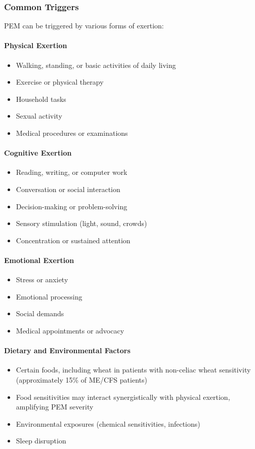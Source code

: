 \subsubsection{Common Triggers}

PEM can be triggered by various forms of exertion:

\paragraph{Physical Exertion}
\begin{itemize}
    \item Walking, standing, or basic activities of daily living
    \item Exercise or physical therapy
    \item Household tasks
    \item Sexual activity
    \item Medical procedures or examinations
\end{itemize}

\paragraph{Cognitive Exertion}
\begin{itemize}
    \item Reading, writing, or computer work
    \item Conversation or social interaction
    \item Decision-making or problem-solving
    \item Sensory stimulation (light, sound, crowds)
    \item Concentration or sustained attention
\end{itemize}

\paragraph{Emotional Exertion}
\begin{itemize}
    \item Stress or anxiety
    \item Emotional processing
    \item Social demands
    \item Medical appointments or advocacy
\end{itemize}

\paragraph{Dietary and Environmental Factors}
\begin{itemize}
    \item Certain foods, including wheat in patients with non-celiac wheat sensitivity (approximately 15\% of ME/CFS patients)
    \item Food sensitivities may interact synergistically with physical exertion, amplifying PEM severity
    \item Environmental exposures (chemical sensitivities, infections)
    \item Sleep disruption
\end{itemize}

